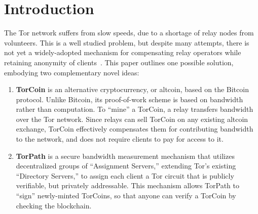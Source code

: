 \section{Introduction}

The Tor network suffers from slow speeds, due to a shortage of relay nodes from
volunteers. This is a well studied problem, but despite many attempts, there is
not yet a widely-adopted mechanism for compensating relay operators while
retaining anonymity of clients~\cite{raykova- pet2008, wpes09-xpay,
incentives-fc10, ccs10-braids, acsac11-tortoise, jansen2013lira,
johnson2013onions}.
This paper outlines one possible solution, embodying two complementary
novel ideas:

\begin{enumerate}

\item
\textbf{TorCoin} is an alternative cryptocurrency, or
altcoin, based on the Bitcoin protocol\cite{nakamoto2008bitcoin}. Unlike
Bitcoin, its proof-of-work scheme is based on bandwidth rather than
computation. To ``mine''  a TorCoin, a relay transfers bandwidth
over the Tor network. Since relays can sell  TorCoin on any existing altcoin
exchange, TorCoin effectively compensates them for  contributing bandwidth to
the network, and does not require clients to pay for  access to it.
\\
\item
\textbf{TorPath} is a secure bandwidth measurement mechanism
that utilizes decentralized groups of ``Assignment Servers,''
extending Tor's existing ``Directory Servers,'' to assign each client a Tor
circuit that is publicly verifiable, but privately addressable. This mechanism 
allows TorPath to ``sign'' newly-minted TorCoins, so that anyone can verify a
TorCoin by checking the blockchain. \end{enumerate}

